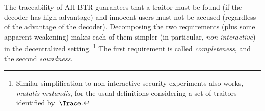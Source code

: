 The traceability of AH-BTR guarantees that a traitor must be found (if the decoder has high advantage) and innocent users must not be accused (regardless of the advantage of the decoder).
Decomposing the two requirements (plus some apparent weakening) makes each of them simpler (in particular, \emph{non-interactive}) in the decentralized setting.%
\footnote{Similar simplification to non-interactive security experiments
also works, \textit{mutatis mutandis}, for the usual definitions
considering a set of traitors identified by~$\Trace$.}
The first requirement is called \emph{completeness}, and the second \emph{soundness}.
